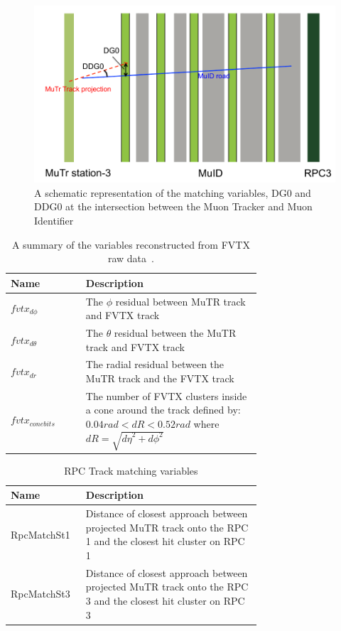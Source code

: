 \begin{figure}[ht]
  \centering
  \includegraphics[width=0.7\linewidth]{./figures/dg0_ddg0.png}
  \caption{
    A schematic representation of the matching variables, DG0 and DDG0 at
    the intersection between the Muon Tracker and Muon 
    Identifier~\cite{Oide2012}
  }
  \label{fig:dg0_ddg0}
\end{figure}

\begin{table}[ht]
  \centering
  \begin{tabular}{l p{0.7\linewidth}}
    \toprule
    \textbf{Name} & \textbf{Description} \\
    \midrule
    $fvtx_{d\phi}$ & The $\phi$ residual between MuTR track and FVTX track \\
    $fvtx_{d\theta}$ & The $\theta$ residual between the MuTR track and FVTX track \\
    $fvtx_{dr}$ & The radial residual between the MuTR track and the FVTX track \\
    $fvtx_{conebits}$ & The number of FVTX clusters inside a cone around the track defined by: $0.04 rad < dR < 0.52 rad$ where $dR = \sqrt{{d\eta}^2+{d\phi}^2}$\\
    \bottomrule
  \end{tabular}
  \caption{A summary of the variables reconstructed from FVTX raw data~\cite{Meles2015}.}
  \label{tab:fvtx_variables}
\end{table}

\begin{table}[ht]
  \centering
  \begin{tabular}{l p{0.7\linewidth}}
    \toprule
    \textbf{Name} & \textbf{Description} \\
    \midrule
    RpcMatchSt1 & Distance of closest approach between projected MuTR track onto the RPC 1 and the closest hit cluster on RPC 1\\
    RpcMatchSt3 & Distance of closest approach between projected MuTR track onto the RPC 3 and the closest hit cluster on RPC 3\\
    \bottomrule
  \end{tabular}
  \caption{RPC Track matching variables}
  \label{tab:rpc_variables}
\end{table}

